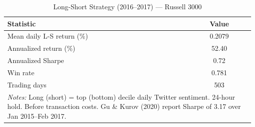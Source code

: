 \begin{table}[htbp]
\centering
\caption{Long-Short Strategy (2016--2017) --- Russell 3000}
\label{tab:russel_2016_t6}
\begin{tabular}{lc}
\hline\hline
Statistic & Value \\
\hline
Mean daily L-S return (\%) & 0.2079 \\
Annualized return (\%)     & 52.40 \\
Annualized Sharpe           & 0.72 \\
Win rate                    & 0.781 \\
Trading days                & 503 \\
\hline\hline
\multicolumn{2}{p{0.75\linewidth}}{\footnotesize \textit{Notes:} Long (short) = top (bottom) decile daily Twitter sentiment. 24-hour hold. Before transaction costs. Gu \& Kurov (2020) report Sharpe of 3.17 over Jan 2015--Feb 2017.}\n\end{tabular}
\end{table}
